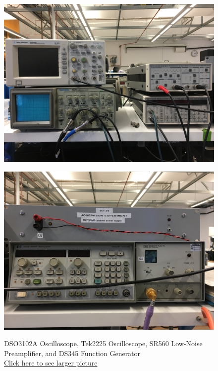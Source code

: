 \documentclass{../lab}
\begin{document}
\begin{figure}[H]
  \href{http://experimentationlab.berkeley.edu/sites/default/files/JOS_3507_Preamp_scope_function_generator.JPG}{\includegraphics[width=\linewidth,keepaspectratio]{images/JOS_3507_Preamp_scope_function_generator.JPG}}
  \caption{DSO3102A Oscilloscope, Tek2225 Oscilloscope, SR560 Low-Noise Preamplifier, and DS345 Function Generator\\ \href{http://experimentationlab.berkeley.edu/sites/default/files/JOS_3507_Preamp_scope_function_generator.JPG}{Click here to see larger picture}}
  \label{fig:JOS_3507_Preamp_scope_function_generator.JPG}
\endminipage\hfill
{}
  \href{http://experimentationlab.berkeley.edu/sites/default/files/JOS_3507_Power_Sweep_RF.JPG}{\includegraphics[width=\linewidth,keepaspectratio]{images/JOS_3507_Power_Sweep_RF.JPG}}

\end{figure}
\end{document}
